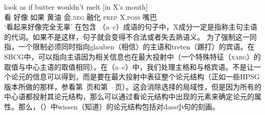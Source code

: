 \gll look as if butter wouldn't melt [in X's mouth]\\
看 好像 如果 黄油 会.\textsc{neg} 融化 \spacebr{}\textsc{prep} X.\textsc{poss} 嘴巴\\
\glt `看起来好像完全无辜'
\zl
在包含 （a--c）成语的句子中，X成分一定是指称主句主语的代词。如果不是这样，句子就会变得不合法或者失去熟语义。
\eal
{}
\zl
为了强制这一同指，一个限制必须同时指向glauben（相信）的主语和treten（踢打）的宾语。在SBCG中，可以指向主语因为相关信息也在最大投射中（一个特殊特征（\textsc{xarg}）的取值与中心主语的取值相同）。在（a--c）中，我们处理主格和与格宾语。不是让一个论元的信息可以得到，而是要在最大投射中表征整个论元结构（正如一些HPSG版本所做的那样，参看第~\pageref{Seite-Bender-Wambaya}页和第~\pageref{page-Bender-Wambaya-two}--\pageref{page-non-cancellation-end}页）。这会消除选择的局域性，但是因为所有的中心语都投射其论元结构，那么可以通过看论元结构中出现的元素来确定论元的属性。那么，（）中wissen（知道）的论元结构包括对dass小句的刻画。
